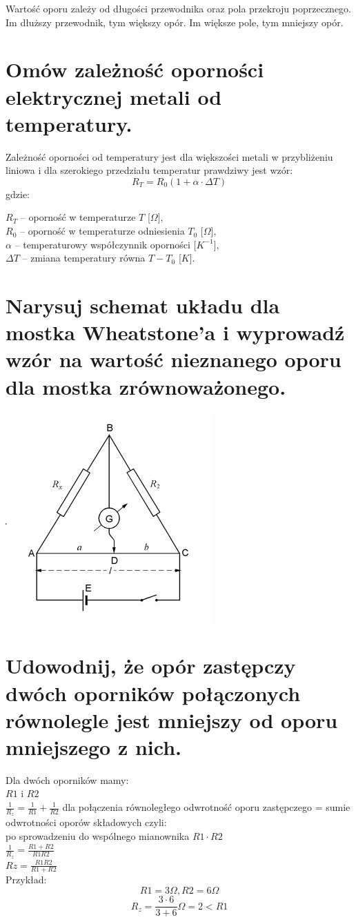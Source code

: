 \documentclass[a4paper,11pt]{article} %
\begin{document}
Wartość oporu zależy od długości przewodnika oraz pola przekroju poprzecznego. Im dłuższy przewodnik, tym większy opór. Im większe pole, tym mniejszy opór.

\section{Omów zależność oporności elektrycznej metali od temperatury. 
}
Zależność oporności od temperatury jest dla większości metali w przybliżeniu liniowa i dla szerokiego przedziału temperatur prawdziwy jest wzór:
$$ R_T = R_0(1+\alpha \cdot \Delta T)$$
gdzie:

$R_{T}$  – oporność w temperaturze $T$  [$\Omega$],\\
$R_{0}$  – oporność w temperaturze odniesienia $T_{0}$  [$\Omega$],\\
$\alpha$  – temperaturowy współczynnik oporności [$K^{-1}$],\\
$\Delta T$  – zmiana temperatury równa $T-T_{0}$  [$K$].

\section{Narysuj schemat układu dla mostka Wheatstone’a i wyprowadź wzór na
wartość nieznanego oporu dla mostka zrównoważonego.}
\includegraphics[scale=1]{mostek.jpg}

\section{Udowodnij, że opór zastępczy dwóch oporników połączonych równolegle
jest mniejszy od oporu mniejszego z nich.}

Dla dwóch oporników mamy:\\
$R1$ i $R2$\\
$\frac{1}{R_z} = \frac{1}{R1} + \frac{1}{R2}$ dla połączenia równoległego odwrotność oporu zastępczego = sumie odwrotności oporów składowych czyli:\\ po sprowadzeniu do wspólnego mianownika $R1 \cdot R2$ \\
$\frac{1}{R_z}= \frac{R1 + R2}{R1R2}$\\
$Rz = \frac{R1R2}{R1 + R2}$\\
Przykład: 
$$R1 = 3 \Omega , R2 = 6 \Omega$$
$$R_z = \frac{3\cdot6}{3+6} \Omega = 2 < R1$$
\end{document}
